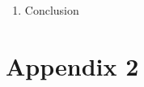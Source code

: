 \documentclass{article}
\begin{document}
\begin{enumerate}
\item Conclusion
\end{enumerate}
\vspace{5cm}
\section*{\LARGE Appendix 2}


\end{document}
